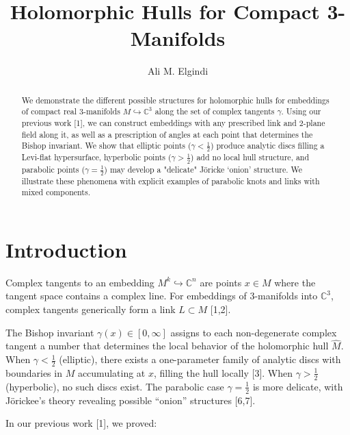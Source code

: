 \documentclass{amsart}
\newcommand{\C}{\mathbb{C}}
\newcommand{\hatM}{\widehat{M}}
\begin{document}
\title{Holomorphic Hulls for Compact 3-Manifolds}
\author{Ali M. Elgindi}
\address{Institute of Mathematics, Henan Academy of Sciences}

\maketitle




\begin{abstract}
We demonstrate the different possible structures for holomorphic hulls for embeddings of compact real 3-manifolds $M \hookrightarrow \mathbb{C}^3$ along the set of complex tangents $\gamma$. Using our previous work [1], we can construct embeddings with any prescribed link and 2-plane field along it, as well as a prescription of angles at each point that determines the Bishop invariant. We show that elliptic points ($\gamma < \frac{1}{2}$) produce analytic discs filling a Levi-flat hypersurface, hyperbolic points ($\gamma > \frac{1}{2}$) add no local hull structure, and parabolic points ($\gamma = \frac{1}{2}$) may develop  a  "delicate" Jöricke  `onion' structure. We illustrate these phenomena with explicit examples of parabolic knots and links with mixed components.
\end{abstract}

\section{Introduction}

Complex tangents to an embedding $M^k \hookrightarrow \C^n$ are points $x \in M$ where the tangent space contains a complex line. For embeddings of 3-manifolds into $\C^3$, complex tangents generically form a link $L \subset M$ [1,2].

The Bishop invariant $\gamma(x) \in [0,\infty]$ assigns to each non-degenerate complex tangent a number that determines the local behavior of the holomorphic hull $\hatM$. When $\gamma < \frac{1}{2}$ (elliptic), there exists a one-parameter family of analytic discs with boundaries in $M$ accumulating at $x$, filling the hull locally [3]. When $\gamma > \frac{1}{2}$ (hyperbolic), no such discs exist. The parabolic case $\gamma = \frac{1}{2}$ is more delicate, with Jörickee's  theory revealing possible ``onion'' structures [6,7].

In our previous work [1], we proved:
\end{document}
